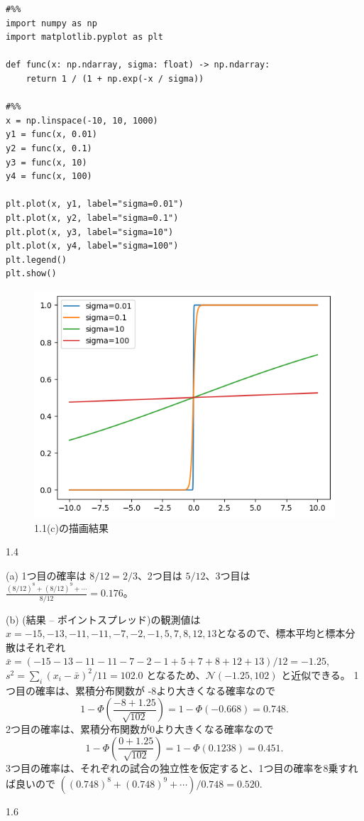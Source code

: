 \documentclass[pdflatex,ja=standard]{bxjsarticle}
\begin{document}
\begin{lstlisting}
#%%
import numpy as np
import matplotlib.pyplot as plt

def func(x: np.ndarray, sigma: float) -> np.ndarray:
    return 1 / (1 + np.exp(-x / sigma))

#%% 
x = np.linspace(-10, 10, 1000)
y1 = func(x, 0.01)
y2 = func(x, 0.1)
y3 = func(x, 10)
y4 = func(x, 100)

plt.plot(x, y1, label="sigma=0.01")
plt.plot(x, y2, label="sigma=0.1")
plt.plot(x, y3, label="sigma=10")
plt.plot(x, y4, label="sigma=100")
plt.legend()
plt.show()
\end{lstlisting}

\begin{figure}
    \centering
    \includegraphics[width=0.5\linewidth]{output_sigmoid_like.png}
    \caption{1.1(c)の描画結果}
    \label{fig:placeholder}
\end{figure}

1.4

(a) 1つ目の確率は $8/12 = 2/3$、2つ目は $5/12$、3つ目は $\frac{(8/12)^8+(8/12)^9 + \cdots}{8/12} = 0.176$。

(b) (結果 -- ポイントスプレッド)の観測値は $x=-15,-13,-11,-11,-7,-2,-1,5,7,8,12,13$となるので、標本平均と標本分散はそれぞれ $\bar{x}=(-15-13-11-11-7-2-1+5+7+8+12+13)/12=-1.25$, $s^2 = \sum_i(x_i-\bar{x})^2/11=102.0$ となるため、$\mathcal{N} (-1.25, 102)$ と近似できる。
1つ目の確率は、累積分布関数が -8より大きくなる確率なので 
\begin{equation}
    1-\Phi(\frac{-8+1.25}{\sqrt{102}}) = 1- \Phi(-0.668) = 0.748.
\end{equation}
2つ目の確率は、累積分布関数が0より大きくなる確率なので
\begin{equation}
    1-\Phi(\frac{0+1.25}{\sqrt{102}}) = 1- \Phi(0.1238) = 0.451.
\end{equation}
3つ目の確率は、それぞれの試合の独立性を仮定すると、1つ目の確率を8乗すれば良いので $((0.748)^8+(0.748)^9+\cdots)/0.748=0.520.$

1.6
\end{document}
